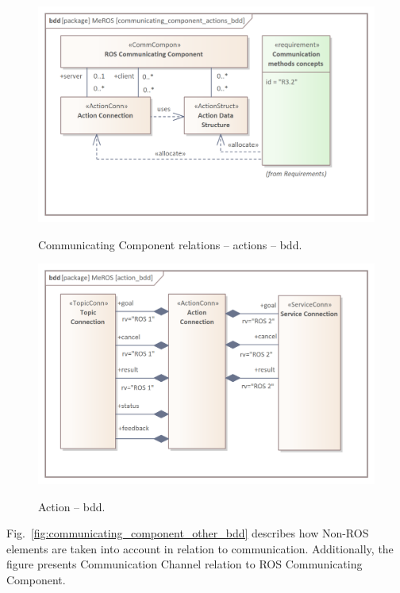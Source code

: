 \documentclass[11pt,oneside,a4paper]{article}
\begin{document}
	\begin{figure}[H]
		\centering
		\begin{center}
			{\includegraphics[scale=1.0]{img/meros_pkg/communicating_component_actions_bdd.png}}
		\end{center}
		\caption{Communicating Component relations -- actions -- bdd.} 
		\label{fig:communicating_component_actions_bdd}
	\end{figure}
	\begin{figure}[hbt]
		\centering
		\begin{center}
			{\includegraphics[scale=1.0]{img/meros_pkg/action_bdd.png}}
		\end{center}
		\caption{Action -- bdd.} 
		\label{fig:action_bdd}
	\end{figure}
	
	\pagebreak
	
	Fig.~\ref{fig:communicating_component_other_bdd} describes how Non-ROS elements are taken into account in relation to communication. Additionally, the figure presents Communication Channel relation to ROS Communicating Component.
	
\end{document}
